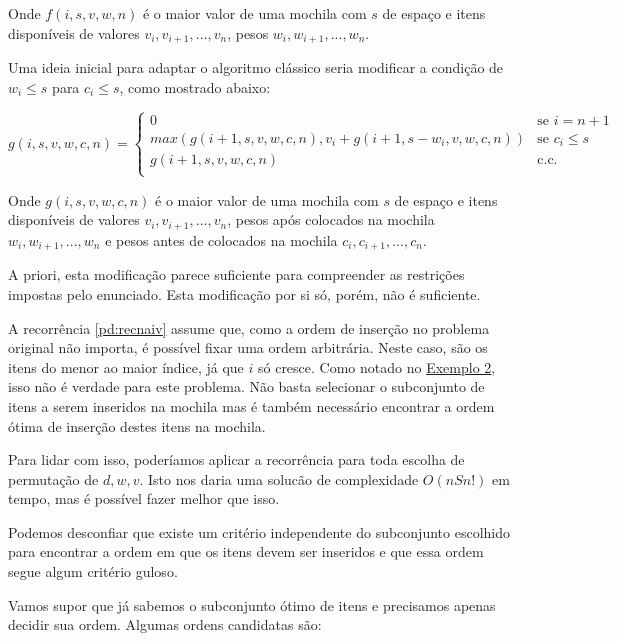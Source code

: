 Onde $f(i, s, v, w, n)$ é o maior valor de uma mochila com $s$ de espaço e itens disponíveis de valores $v_i, v_{i + 1}, ..., v_n$, pesos $w_i, w_{i + 1}, ..., w_n$.

Uma ideia inicial para adaptar o algoritmo clássico seria modificar a condição de $w_i \leq s$ para $c_i \leq s$, como mostrado abaixo:

\begin{equation} \label{pd:recok}
  g(i, s, v, w, c, n) =
  \begin{cases}
  0                                                                   & \text{se $i = n + 1$} \\
  max(g(i + 1, s, v, w, c, n), v_i + g(i + 1, s - w_i, v, w, c, n))   & \text{se $c_i \leq s$} \\
  g(i + 1, s, v, w, c, n)                                             & \text{c.c.} \\
  \end{cases}
\end{equation}

Onde $g(i, s, v, w, c, n)$ é o maior valor de uma mochila com $s$ de espaço e itens disponíveis de valores $v_i, v_{i + 1}, ..., v_n$, pesos após colocados na mochila $w_i, w_{i + 1}, ..., w_n$ e pesos antes de colocados na mochila $c_i, c_{i + 1}, ..., c_n$.

A priori, esta modificação parece suficiente para compreender as restrições impostas pelo enunciado. Esta modificação por si só, porém, não é suficiente. 

A recorrência \ref{pd:recnaiv} assume que, como a ordem de inserção no problema original não importa, é possível fixar uma ordem arbitrária. Neste caso, são os itens do menor ao maior índice, já que $i$ só cresce. Como notado no \hyperref[pd:ex2]{Exemplo 2}, isso não é verdade para este problema. Não basta selecionar o subconjunto de itens a serem inseridos na mochila mas é também necessário encontrar a ordem ótima de inserção destes itens na mochila.

Para lidar com isso, poderíamos aplicar a recorrência \label{pd:recnaiv} para toda escolha de permutação de $d, w, v$. Isto nos daria uma solucão de complexidade $O(nSn!)$ em tempo, mas é possível fazer melhor que isso.

Podemos desconfiar que existe um critério independente do subconjunto escolhido para encontrar a ordem em que os itens devem ser inseridos e que essa ordem segue algum critério guloso.

Vamos supor que já sabemos o subconjunto ótimo de itens e precisamos apenas decidir sua ordem. Algumas ordens candidatas são:


